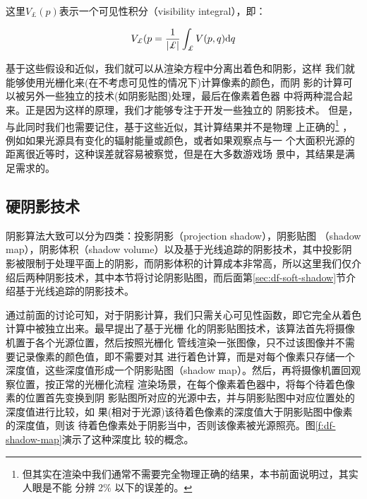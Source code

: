 \noindent 这里$V_{\pounds}({p})$表示一个可见性积分（visibility integral），即：

\begin{equation}
	V_{\pounds}({p}=\frac{1}{|\pounds|}\int_{\pounds}V({p},{q}){\rm d}{q}
\end{equation}  

基于这些假设和近似，我们就可以从渲染方程中分离出着色和阴影，这样 我们就能够使用光栅化来(在不考虑可见性的情况下)计算像素的颜色，而阴 影的计算可以被另外一些独立的技术(如阴影贴图)处理，最后在像素着色器 中将两种混合起来。正是因为这样的原理，我们才能够专注于开发一些独立的 阴影技术。
但是，与此同时我们也需要记住，基于这些近似，其计算结果并不是物理 上正确的\footnote{但其实在渲染中我们通常不需要完全物理正确的结果，本书前面说明过，其实人眼是不能 分辨 2\% 以下的误差的。} ，例如如果光源具有变化的辐射能量或颜色，或者如果观察点与一 个大面积光源的距离很近等时，这种误差就容易被察觉，但是在大多数游戏场 景中，其结果是满足需求的。



\subsection{硬阴影技术}\label{sec:df-hard-shadow}
阴影算法大致可以分为四类：投影阴影（projection shadow），阴影贴图 （shadow map），阴影体积（shadow volume）以及基于光线追踪的阴影技术，其中投影阴影被限制于处理平面上的阴影，而阴影体积的计算成本非常高，所以这里我们仅介绍后两种阴影技术，其中本节将讨论阴影贴图，而后面第\ref{sec:df-soft-shadow}节介绍基于光线追踪的阴影技术。

通过前面的讨论可知，对于阴影计算，我们只需关心可见性函数，即它完全从着色计算中被独立出来。\cite{a:Castingcurvedshadowsoncurvedsurfaces}最早提出了基于光栅 化的阴影贴图技术，该算法首先将摄像机置于各个光源位置，然后按照光栅化 管线渲染一张图像，只不过该图像并不需要记录像素的颜色值，即不需要对其 进行着色计算，而是对每个像素只存储一个深度值，这些深度值形成一个阴影贴图（shadow map）。然后，再将摄像机置回观察位置，按正常的光栅化流程 渲染场景，在每个像素着色器中，将每个待着色像素的位置首先变换到阴 影贴图所对应的光源中去，并与阴影贴图中对应位置处的深度值进行比较，如 果(相对于光源)该待着色像素的深度值大于阴影贴图中像素的深度值，则该 待着色像素处于阴影当中，否则该像素被光源照亮。图\ref{f:df-shadow-map}演示了这种深度比 较的概念。

